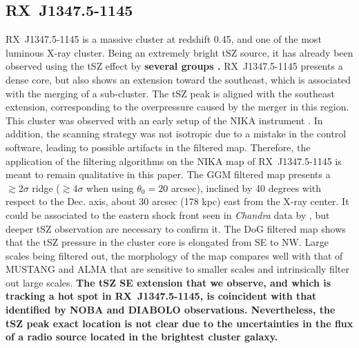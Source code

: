 \documentclass[twocolumn,traditabstract]{aa}
\begin{document}
\subsection{RX~J1347.5-1145}\label{sec:RXJ1347.5-1145}
\mbox{RX~J1347.5-1145} is a massive cluster at redshift 0.45, and one of the most luminous X-ray cluster. Being an extremely bright tSZ source, it has already been observed using the tSZ effect by {\bf several groups \citep[e.g.][]{Komatsu1999,Pointecouteau1999,Kitayama2004,Mason2010,Plagge2012,Adam2014,Sayers2016,Kitayama2016}.} \mbox{RX~J1347.5-1145} presents a dense core, but also shows an extension toward the southeast, which is associated with the merging of a sub-cluster. The tSZ peak is aligned with the southeast extension, corresponding to the overpressure caused by the merger in this region. This cluster was observed with an early setup of the NIKA instrument \citep[bandpass, sensitivity, calibration procedure, see][for more details]{Adam2014}. In addition, the scanning strategy was not isotropic due to a mistake in the control software, leading to possible artifacts in the filtered map. Therefore, the application of the filtering algorithms on the NIKA map of \mbox{RX~J1347.5-1145} is meant to remain qualitative in this paper. The GGM filtered map presents a $\gtrsim 2 \sigma$ ridge ($\gtrsim 4 \sigma$ when using $\theta_0 = 20$ arcsec), inclined by 40 degrees with respect to the Dec. axis, about 30 arcsec (178 kpc) east from the X-ray center. It could be associated to the eastern shock front seen in \textit{Chandra} data by \cite{Kreisch2016}, but deeper tSZ observation are necessary to confirm it. The DoG filtered map shows that the tSZ pressure in the cluster core is elongated from SE to NW. Large scales being filtered out, the morphology of the map compares well with that of MUSTANG \citep{Mason2010} and ALMA \citep{Kitayama2016} that are sensitive to smaller scales and intrinsically filter out large scales. {\bf The tSZ SE extension that we observe, and which is tracking a hot spot in \mbox{RX~J1347.5-1145}, is coincident with that identified by NOBA \citep[Nobeyama Bolometer Array][]{Kitayama2004} and DIABOLO \citep[on the IRAM 30m telescope][]{Pointecouteau1999,Pointecouteau2001} observations. Nevertheless, the tSZ peak exact location is not clear due to the uncertainties in the flux of a radio source located in the brightest cluster galaxy.}

\end{document}
